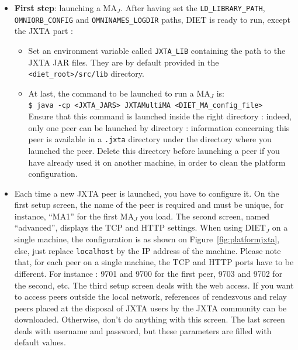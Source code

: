 \begin{itemize}

  \item{\textbf{First step}: launching a MA$_{J}$. After having set
      the \texttt{LD\_LIBRARY\_PATH}, \\ \texttt{OMNIORB\_CONFIG} and
      \texttt{OMNINAMES\_LOGDIR} paths, DIET is ready to run, except
      the JXTA part :}
    \begin{itemize}
      \item{Set an environment variable called \texttt{JXTA\_LIB}
      containing the path to the JXTA JAR files. They are by default
      provided in the \texttt{<diet\_root>/src/lib} directory.}

  \item{At last, the command to be launched to run a MA$_{J}$ is:\\
      \noindent
      {\footnotesize \texttt{\$ java -cp <JXTA\_JARS> JXTAMultiMA
          <DIET\_MA\_config\_file>} } \\Ensure that this command is
      launched inside the right directory : indeed, only one peer can
      be launched by directory : information concerning this peer is
      available in a \texttt{.jxta} directory under the directory
      where you launched the peer.  Delete this directory before
      launching a peer if you have already used it on another machine,
      in order to clean the platform configuration.}
    \end{itemize}
    
  \item{Each time a new JXTA peer is launched, you have to configure
      it.  On the first setup screen, the name of the peer is required
      and must be unique, for instance, ``MA1'' for the first MA$_{J}$
      you load. The second screen, named ``advanced'', displays the
      TCP and HTTP settings. When using DIET$_{J}$ on a single
      machine, the configuration is as shown on
      Figure~\ref{fig:platformjxta}, else, just replace \texttt{localhost}
      by the IP address of the machine.  Please note that, for each
      peer on a single machine, the TCP and HTTP ports have to be
      different. For instance : 9701 and 9700 for the first peer, 9703
      and 9702 for the second, etc. The third setup screen deals with
      the web access. If you want to access peers outside the local
      network, references of rendezvous and relay peers placed at the
      disposal of JXTA users by the JXTA community can be
      downloaded. Otherwise, don't do anything with this screen. The
      last screen deals with username and password, but these
      parameters are filled with default values.}


\end{itemize}
